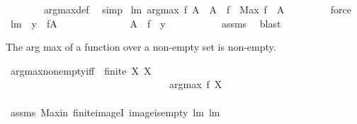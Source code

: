 \begin{isabellebody}
%
\isadelimproof
\ \ \ \ \ \ %
\endisadelimproof
%
\isatagproof
{}\isamarkupfalse%
\ argmax{\isacharunderscore}def\ \isamarkupfalse%
\ simp%
\endisatagproof
{\isafoldproof}%
%
\isadelimproof
\isanewline
%
\endisadelimproof
\isanewline
{}\isamarkupfalse%
\ lm{}{}{\isacharcolon}\ {\isachardoublequoteopen}argmax\ f\ A\ {\isacharequal}\ A\ {\isasyminter}\ f\ {\isacharminus}{\isacharbackquote}\ {\isacharbraceleft}Max\ {\isacharparenleft}f\ {\isacharbackquote}\ A{\isacharparenright}{\isacharbraceright}{\isachardoublequoteclose}\ \isanewline
%
\isadelimproof
\ \ \ \ \ \ %
\endisadelimproof
%
\isatagproof
{}\isamarkupfalse%
\ force%
\endisatagproof
{\isafoldproof}%
%
\isadelimproof
\isanewline
%
\endisadelimproof
\isanewline
{}\isamarkupfalse%
\ lm{}{}{\isacharcolon}\ \ {\isachardoublequoteopen}y\ {\isasymin}\ f{\isacharbackquote}A{\isachardoublequoteclose}\ \isanewline
\ \ \ \ \ \ \ \ \ \ \ \ \ {\isachardoublequoteopen}A\ {\isasyminter}\ f\ {\isacharminus}{\isacharbackquote}\ {\isacharbraceleft}y{\isacharbraceright}\ {\isasymnoteq}\ {\isacharbraceleft}{\isacharbraceright}{\isachardoublequoteclose}\ \isanewline
%
\isadelimproof
\ \ \ \ \ \ %
\endisadelimproof
%
\isatagproof
{}\isamarkupfalse%
\ assms\ \isamarkupfalse%
\ blast%
\endisatagproof
{\isafoldproof}%
%
\isadelimproof
%
\endisadelimproof
%
\begin{isamarkuptext}%
The arg max of a function over a non-empty set is non-empty.%
\end{isamarkuptext}%
\isamarkuptrue%
\isamarkupfalse%
\ argmax{\isacharunderscore}non{\isacharunderscore}empty{\isacharunderscore}iff{\isacharcolon}\ \ {\isachardoublequoteopen}finite\ X{\isachardoublequoteclose}\ {\isachardoublequoteopen}X\ {\isasymnoteq}\ {\isacharbraceleft}{\isacharbraceright}{\isachardoublequoteclose}\ \isanewline
\ \ \ \ \ \ \ \ \ \ \ \ \ \ \ \ \ \ \ \ \ \ \ \ \ \ \ \ \ \ \ \ \ {\isachardoublequoteopen}argmax\ f\ X\ {\isasymnoteq}{\isacharbraceleft}{\isacharbraceright}{\isachardoublequoteclose}\isanewline
%
\isadelimproof
\ \ \ \ \ \ \ \ \ \ \ \ \ \ \ \ \ \ \ \ \ \ \ \ \ \ \ \ \ \ \ \ %
\endisadelimproof
%
\isatagproof
{}\isamarkupfalse%
\ assms\ Max{\isacharunderscore}in\ finite{\isacharunderscore}imageI\ image{\isacharunderscore}is{\isacharunderscore}empty\ lm{}{}\ lm{}{}\ \isanewline

\end{isabellebody}
